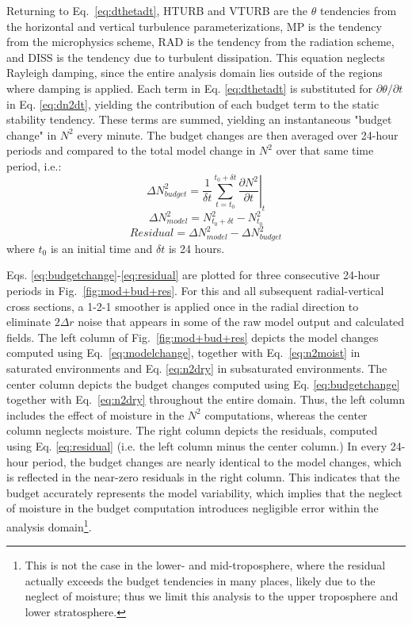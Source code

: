 \documentclass{ametsoc}
\begin{document}
Returning to Eq.~\ref{eq:dthetadt}, HTURB and VTURB are the $\theta$ tendencies from the horizontal and vertical turbulence parameterizations, MP is the tendency from the microphysics scheme, RAD is the tendency from the radiation scheme, and DISS is the tendency due to turbulent dissipation.
This equation neglects Rayleigh damping, since the entire analysis domain lies outside of the regions where damping is applied.
Each term in Eq. \ref{eq:dthetadt} is substituted for ${\partial \theta}/{\partial t}$ in Eq. \ref{eq:dn2dt}, yielding the contribution of each budget term to the static stability tendency.
These terms are summed, yielding an instantaneous "budget change" in $N^2$ every minute.
The budget changes are then averaged over 24-hour periods and compared to the total model change in $N^2$ over that same time period, i.e.:
   \begin{equation} \label{eq:budgetchange}
   \Delta N^2_{budget} = \frac{1}{\delta t}\sum_{t=t_0}^{t_0+\delta t} \left.\frac{\partial N^2}{\partial t}\right\vert_t
   \end{equation}
   \begin{equation} \label{eq:modelchange}
   \Delta N^2_{model} = N^2_{t_0+\delta t}-N^2_{t_0}
   \end{equation}
   \begin{equation} \label{eq:residual}
   Residual = \Delta N^2_{model}-\Delta N^2_{budget}
   \end{equation}
where $t_0$ is an initial time and $\delta t$ is 24 hours.

Eqs. \ref{eq:budgetchange}-\ref{eq:residual} are plotted for three consecutive 24-hour periods in Fig.~\ref{fig:mod+bud+res}.
For this and all subsequent radial-vertical cross sections, a 1-2-1 smoother is applied once in the radial direction to eliminate $2\Delta r$ noise that appears in some of the raw model output and calculated fields.
      The left column of Fig.~\ref{fig:mod+bud+res} depicts the model changes computed using Eq.~\ref{eq:modelchange}, together with Eq.~\ref{eq:n2moist} in saturated environments and Eq. \ref{eq:n2dry} in subsaturated environments.
The center column depicts the budget changes computed using Eq. \ref{eq:budgetchange} together with Eq.~\ref{eq:n2dry} throughout the entire domain.
Thus, the left column includes the effect of moisture in the $N^2$ computations, whereas the center column neglects moisture.
The right column depicts the residuals, computed using Eq. \ref{eq:residual} (i.e. the left column minus the center column.)
In every 24-hour period, the budget changes are nearly identical to the model changes, which is reflected in the near-zero residuals in the right column.
This indicates that the budget accurately represents the model variability, which implies that the neglect of moisture in the budget computation introduces negligible error within the analysis domain\footnote{This is not the case in the lower- and mid-troposphere, where the residual actually exceeds the budget tendencies in many places, likely due to the neglect of moisture; thus we limit this analysis to the upper troposphere and lower stratosphere.}.
\end{document}
